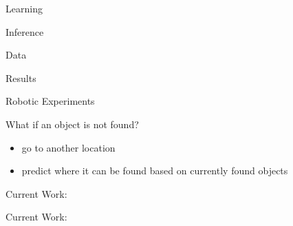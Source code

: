 \documentclass{beamer}
\begin{document}
\begin{frame}{Learning}

\end{frame}

\begin{frame}{Inference}
 
 
\end{frame}

\begin{frame}{Data}

\end{frame}


\begin{frame}{Results }
\end{frame}

\begin{frame}{Robotic Experiments}
\end{frame}

\begin{frame}{What if an object is not found?}

\begin{itemize}
\item go to another location
\item predict where it can be found based on currently found objects
\end{itemize}

\end{frame}

\begin{frame}{Current Work: }


\end{frame}

\begin{frame}{Current Work: }
\end{frame}
\end{document}
